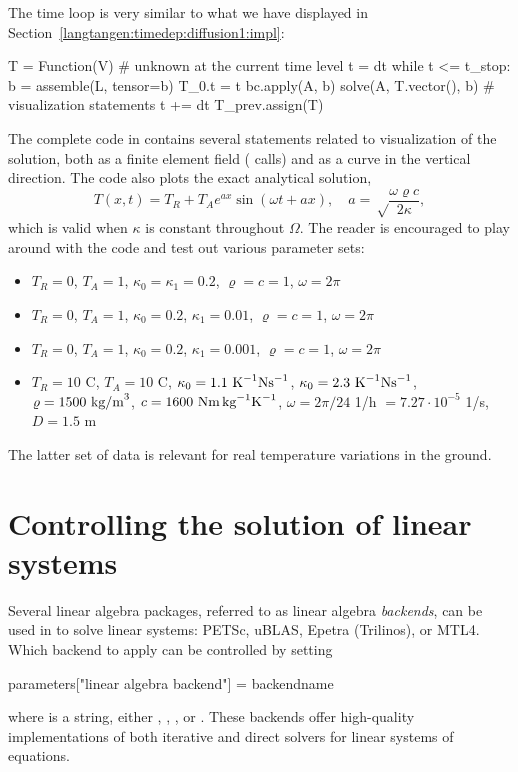 The time loop is very similar to what we have displayed in
Section~\ref{langtangen:timedep:diffusion1:impl}:
\begin{python}
T = Function(V)   # unknown at the current time level
t = dt
while t <= t_stop:
    b = assemble(L, tensor=b)
    T_0.t = t
    bc.apply(A, b)
    solve(A, T.vector(), b)
    # visualization statements
    t += dt
    T_prev.assign(T)
\end{python}
The complete code in  contains several
statements related to visualization of the solution, both as a
finite element field ( calls) and as a curve in the
vertical direction. The code also plots the exact analytical solution,
\[
T(x,t) = T_R + T_Ae^{ax}\sin (\omega t + ax),\quad a =\sqrt \frac{\omega\varrho c}{2\kappa},
\]
which is valid when $\kappa$ is constant throughout $\Omega$.
The reader is encouraged
to play around with the code and test out various parameter sets:
\begin{itemize}
\item $T_R=0$, $T_A=1$, $\kappa_0 = \kappa_1=0.2$, $\varrho = c = 1$, $\omega = 2\pi$
\item $T_R=0$, $T_A=1$, $\kappa_0=0.2$, $\kappa_1=0.01$, $\varrho = c = 1$, $\omega = 2\pi$
\item $T_R=0$, $T_A=1$, $\kappa_0=0.2$, $\kappa_1=0.001$, $\varrho = c = 1$, $\omega = 2\pi$
\item $T_R=10$ C, $T_A=10$ C, $\kappa_0= 1.1 \hbox{ K}^{-1}\hbox{Ns}^{-1}$,
$\kappa_0= 2.3 \hbox{ K}^{-1}\hbox{Ns}^{-1}$,
$\varrho = 1500\hbox{ kg/m}^3$,
$c = 1600\hbox{ Nm\,kg}^{-1}\hbox{K}^{-1}$,
$\omega = 2\pi/24$ 1/h  $= 7.27\cdot 10^{-5}$ 1/s, $D=1.5$ m
\end{itemize}
The latter set of data is relevant for real temperature variations in the
ground.

\section{Controlling the solution of linear systems}
\label{langtangen:linsys}
\label{linear algebra backends}
\label{linear solver choice}
\label{preconditioner choice}

Several linear algebra packages, referred to as
linear algebra \emph{backends}, can be used in \fenics{} to solve
linear systems:
PETSc, uBLAS, Epetra (Trilinos), or MTL4.
Which backend to apply can be controlled by setting
\begin{python}
parameters["linear algebra backend"] = backendname
\end{python}
where  is a string, either ,
, , or .
These backends offer high-quality implementations of both iterative
and direct solvers for linear systems of equations.

